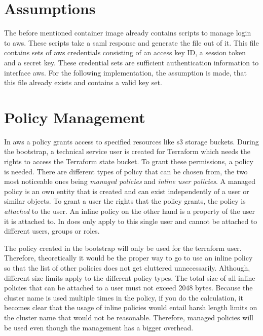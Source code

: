 \section{Assumptions}
The before mentioned container image already contains scripts to manage login to \ac{aws}.
These scripts take a \ac{saml} response and generate the file  out of it.
This file contains sets of \ac{aws} credentials consisting of an access key ID, a session token and a secret key.
These credential sets are sufficient authentication information to interface \ac{aws}.
For the following implementation, the assumption is made, that this file already exists and contains a valid key set.

\section{Policy Management}
In \ac{aws} a policy grants access to specified resources like \ac{s3} storage buckets.
During the bootstrap, a technical service user is created for Terraform which needs the rights to access the Terraform state bucket.
To grant these permissions, a policy is needed.
There are different types of policy that can be chosen from, the two most noticeable ones being \emph{managed policies} and \emph{inline user policies}.
A managed policy is an own entity that is created and can exist independently of a user or similar objects.
To grant a user the rights that the policy grants, the policy is \emph{attached} to the user.
An inline policy on the other hand is a property of the user it is attached to.
In does only apply to this single user and cannot be attached to different users, groups or roles.

The policy created in the bootstrap will only be used for the terraform user.
Therefore, theoretically it would be the proper way to go to use an inline policy so that the list of other policies does not get cluttered unnecessarily.
Although, different size limits apply to the different policy types.
The total size of all inline policies that can be attached to a user must not exceed 2048 bytes.
Because the cluster name is used multiple times in the policy, if you do the calculation, it becomes clear that the usage of inline policies would entail harsh length limits on the cluster name that would not be reasonable.
Therefore, managed policies will be used even though the management has a bigger overhead.
